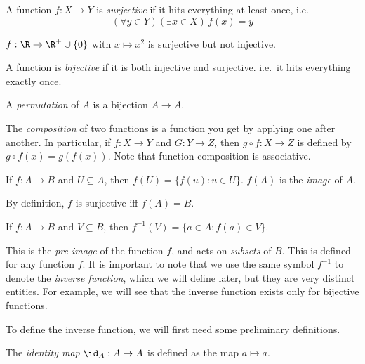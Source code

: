 \documentclass[a4paper]{article}
\begin{document}
\begin{defi}
  A function $f: X \to Y$ is \emph{surjective} if it hits everything at least once, i.e.
  \[
    (\forall y\in Y)(\exists x\in X)\,f(x) = y
  \]
\end{defi}

\begin{eg}
  $f: \R \to\R^+\cup\{0\}$ with $x \mapsto x^2$ is surjective but not injective.
\end{eg}

\begin{defi}
  A function is \emph{bijective} if it is both injective and surjective. i.e.\ it hits everything exactly once.
\end{defi}

\begin{defi}[Permutation]
  A \emph{permutation} of $A$ is a bijection $A\to A$.
\end{defi}

\begin{defi}
  The \emph{composition} of two functions is a function you get by applying one after another. In particular, if $f: X \rightarrow Y$ and $G: Y\rightarrow Z$, then $g\circ f: X \rightarrow Z$ is defined by $g\circ f(x) = g(f(x))$. Note that function composition is associative.
\end{defi}

\begin{defi}
  If $f: A\to B$ and $U\subseteq A$, then $f(U) = \{f(u):u\in U\}$. $f(A)$ is the \emph{image} of $A$.
\end{defi}
By definition, $f$ is surjective iff $f(A) = B$.

\begin{defi}
  If $f: A\to B$ and $V\subseteq B$, then $f^{-1}(V) = \{a\in A: f(a)\in V\}$.
\end{defi}
This is the \emph{pre-image} of the function $f$, and acts on \emph{subsets} of $B$. This is defined for any function $f$. It is important to note that we use the same symbol $f^{-1}$ to denote the \emph{inverse function}, which we will define later, but they are very distinct entities. For example, we will see that the inverse function exists only for bijective functions.

To define the inverse function, we will first need some preliminary definitions.

\begin{defi}
  The \emph{identity map} $\id _A: A\to A$ is defined as the map $a\mapsto a$.
\end{defi}
\end{document}
